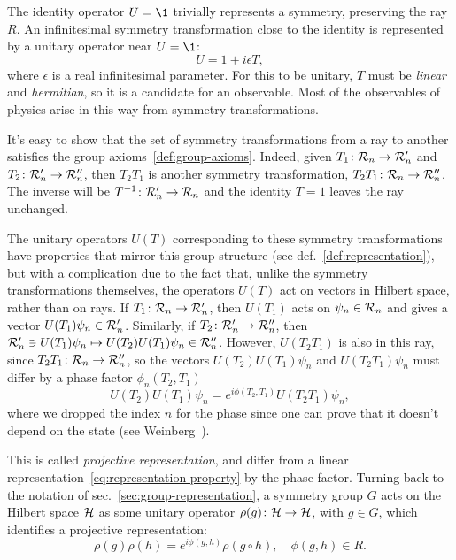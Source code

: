 The identity operator $U = \1$ trivially represents a symmetry, preserving the ray $R$.
An infinitesimal symmetry transformation close to the identity is represented by a unitary
operator near $U = \1$:
\begin{equation}
    U = 1 + i \epsilon T ,
\end{equation}
where $\epsilon$ is a real infinitesimal parameter. For this to be unitary, $T$ must be \emph{linear} and \emph{hermitian}, so it is a candidate for an observable. Most of the observables of physics arise in this way from symmetry transformations.

It's easy to show that the set of symmetry transformations from a ray to another satisfies the group axioms~\ref{def:group-axioms}. Indeed, given $T_1 \colon \mathcal{R}_n \to \mathcal{R}'_n$ and $T_2 \colon \mathcal{R}'_n \to \mathcal{R}''_n$, then $T_2 T_1$ is another symmetry transformation, $T_2 T_1 \colon \mathcal{R}_n \to \mathcal{R}''_n$. The inverse will be $T^{-1} \colon \mathcal{R}'_n \to \mathcal{R}_n$ and the identity $T=1$ leaves the ray unchanged.

The unitary operators $U(T)$ corresponding to these symmetry transformations have properties that mirror this group structure (see def.~\ref{def:representation}), but with a complication due to the fact that, unlike the symmetry transformations themselves, the operators $U(T)$ act on vectors in Hilbert space, rather than on rays. If $T_1 \colon \mathcal{R}_n \to \mathcal{R}'_n$, then $U(T_1)$ acts on $\psi_n \in \mathcal{R}_n$ and gives a vector $U(T_1)\psi_n \in \mathcal{R}'_n$. Similarly, if $T_2 \colon \mathcal{R}'_n \to \mathcal{R}''_n$, then $\mathcal{R}'_n \ni U(T_1)\psi_n \mapsto U(T_2)U(T_1)\psi_n \in \mathcal{R}''_n$. However, $U(T_2 T_1)$ is also in this ray, since $T_2 T_1 \colon \mathcal{R}_n \to \mathcal{R}''_n$, so the vectors $U(T_2)U(T_1)\psi_n$ and $U(T_2T_1)\psi_n$ must differ by a phase factor $\phi_n (T_2, T_1)$
\begin{equation}
    U(T_2)U(T_1)\psi_n = e^{i\phi (T_2, T_1)} U(T_2T_1)\psi_n ,
\end{equation}
where we dropped the index $n$ for the phase since one can prove that it doesn't depend on the state (see Weinberg~\cite{weinberg}).

This is called \emph{projective representation}, and differ from a linear representation~\eqref{eq:representation-property} by the phase factor. Turning back to the notation of sec.~\ref{sec:group-representation}, a symmetry group $G$ acts on the Hilbert space $\mathcal{H}$ as some unitary operator $\rho(g) \colon \mathcal{H} \to \mathcal{H}$, with $g \in G$, which identifies a projective representation:
\begin{equation}
    \rho(g) \rho(h) = e^{i\phi(g,h)} \rho(g \circ h), \quad \phi(g,h) \in R.
\end{equation}

